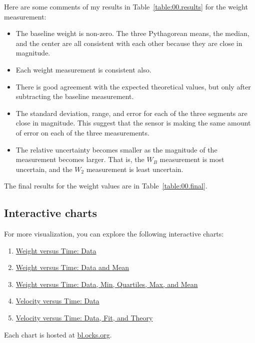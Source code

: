 Here are some comments of my results in Table~\ref{table:00.results} for the weight measurement:
\begin{itemize}
    \item The baseline weight is non-zero. The three Pythagorean means, the median, and the center are all consistent with each other because they are close in magnitude.
    \item Each weight measurement is consistent also.
    \item There is good agreement with the expected theoretical values, but only after subtracting the baseline measurement.
    \item The standard deviation, range, and error for each of the three segments are close in magnitude. This suggest that the sensor is making the same amount of error on each of the three measurements.
    \item The relative uncertainty becomes smaller as the magnitude of the measurement becomes larger. That is, the $W_{B}$ measurement is most uncertain, and the $W_{2}$ measurement is least uncertain.
\end{itemize}
The final results for the weight values are in Table~\ref{table:00.final}.
%
\subsection{Interactive charts}
%
For more visualization, you can explore the following interactive charts:
\begin{enumerate}
    \item \href{https://bl.ocks.org/meirizarrygelpi/4ff9e1ad0a6c6e7ccee79f7f41a793e6}{Weight versus Time: Data}
    \item \href{https://bl.ocks.org/meirizarrygelpi/1ef52b7ff946234fdc74aa956ccf83c9}{Weight versus Time: Data and Mean}
    \item \href{https://bl.ocks.org/meirizarrygelpi/faf2f927d6886b88b075ff7cdb631b30}{Weight versus Time: Data, Min, Quartiles, Max, and Mean}
    \item \href{https://bl.ocks.org/meirizarrygelpi/fd044bb826a7a8e4f141293fa4a64de9}{Velocity versus Time: Data}
    \item \href{https://bl.ocks.org/meirizarrygelpi/d7a581246c16a7763681e5cad1bcad48}{Velocity versus Time: Data, Fit, and Theory}
\end{enumerate}
Each chart is hosted at \href{https://bl.ocks.org/}{bl.ocks.org}.
%
